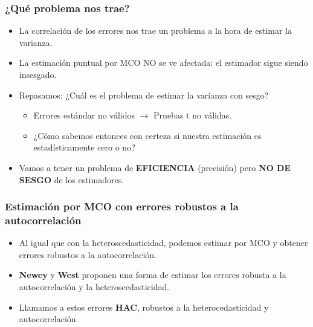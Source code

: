 \documentclass{beamer}
\begin{document}
\begin{frame}
\frametitle{¿Qué problema nos trae?}

\begin{itemize}
  \item La correlación de los errores nos trae un problema a la hora de estimar la varianza.
  \item La estimación puntual por MCO NO se ve afectada: el estimador sigue siendo insesgado.
  \item Repasamos: ¿Cuál es el problema de estimar la varianza con sesgo?
  \begin{itemize}
    \item Errores estándar no válidos \(\rightarrow\) Pruebas t no válidas.
    \item ¿Cómo sabemos entonces con certeza si nuestra estimación es estadísticamente cero o no?
  \end{itemize}
  \item Vamos a tener un problema de \textbf{EFICIENCIA} (precisión) pero \textbf{NO DE SESGO }de los estimadores.
\end{itemize}

\end{frame}


\begin{frame}
\frametitle{Estimación por MCO con errores robustos a la autocorrelación}

\begin{itemize}
  \item Al igual que con la heteroscedasticidad, podemos estimar por MCO y obtener errores robustos a la autocorrelación.
  \item \textbf{Newey} y \textbf{West} proponen una forma de estimar los errores robusta a la autocorrelación y la heteroscedasticidad.
  \item Llamamos a estos errores \textbf{HAC}, robustos a la heterocedasticidad y autocorrelación.
\end{itemize}

\end{frame}
\end{document}
